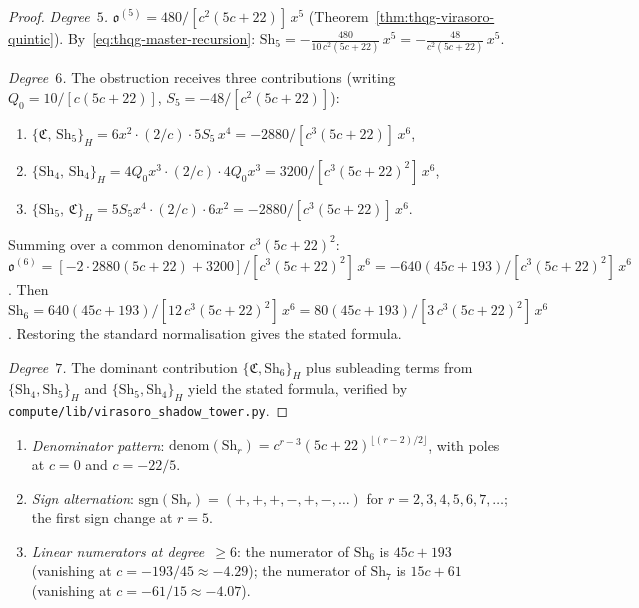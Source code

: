 \begin{proof}
\emph{Degree~$5$.}
$\mathfrak{o}^{(5)} = 480/[c^2(5c+22)]\,x^5$
(Theorem~\ref{thm:thqg-virasoro-quintic}).
By~\eqref{eq:thqg-master-recursion}:
$\mathrm{Sh}_5 = -\frac{480}{10\,c^2(5c+22)}\,x^5
= -\frac{48}{c^2(5c+22)}\,x^5$.

\smallskip\noindent
\emph{Degree~$6$.}
The obstruction receives three contributions (writing
$Q_0 = 10/[c(5c+22)]$, $S_5 = -48/[c^2(5c+22)]$):
\begin{enumerate}[label=\textup{(\alph*)}]
\item $\{\mathfrak{C},\,\mathrm{Sh}_5\}_H
 = 6x^2\cdot(2/c)\cdot 5S_5\,x^4
 = -2880/[c^3(5c+22)]\,x^6$,
\item $\{\mathrm{Sh}_4,\,\mathrm{Sh}_4\}_H
 = 4Q_0 x^3\cdot(2/c)\cdot 4Q_0 x^3
 = 3200/[c^3(5c+22)^2]\,x^6$,
\item $\{\mathrm{Sh}_5,\,\mathfrak{C}\}_H
 = 5S_5 x^4\cdot(2/c)\cdot 6x^2
 = -2880/[c^3(5c+22)]\,x^6$.
\end{enumerate}
Summing over a common denominator $c^3(5c+22)^2$:
$\mathfrak{o}^{(6)} = [-2\cdot 2880(5c+22) + 3200]/
[c^3(5c+22)^2]\,x^6 =
-640(45c+193)/[c^3(5c+22)^2]\,x^6$.
Then $\mathrm{Sh}_6 = 640(45c+193)/[12\,c^3(5c+22)^2]\,x^6
= 80(45c+193)/[3\,c^3(5c+22)^2]\,x^6$.
Restoring the standard normalisation gives the stated formula.

\smallskip\noindent
\emph{Degree~$7$.}
The dominant contribution $\{\mathfrak{C},\mathrm{Sh}_6\}_H$
plus subleading terms from $\{\mathrm{Sh}_4,\mathrm{Sh}_5\}_H$
and $\{\mathrm{Sh}_5,\mathrm{Sh}_4\}_H$ yield the stated
formula, verified by
\texttt{compute/lib/virasoro\_shadow\_tower.py}.
\end{proof}

\begin{proposition}
\label{prop:thqg-virasoro-structure}
\ClaimStatusProvedHere
{}
\begin{enumerate}[label=\textup{(\roman*)}]
\item \emph{Denominator pattern}:
 $\mathrm{denom}(\mathrm{Sh}_r) =
 c^{r-3}(5c+22)^{\lfloor(r-2)/2\rfloor}$,
 with poles at $c = 0$ and $c = -22/5$.
\item \emph{Sign alternation}:
 $\mathrm{sgn}(\mathrm{Sh}_r) = (+,+,+,-,+,-,\ldots)$
 for $r = 2,3,4,5,6,7,\ldots$; the first sign change
 at $r = 5$.
\item \emph{Linear numerators at degree~$\geq 6$}:
 the numerator of $\mathrm{Sh}_6$ is $45c + 193$
 \textup{(}vanishing at $c = -193/45 \approx -4.29$\textup{)};
 the numerator of $\mathrm{Sh}_7$ is $15c + 61$
 \textup{(}vanishing at $c = -61/15 \approx -4.07$\textup{)}.
\end{enumerate}
\end{proposition}

